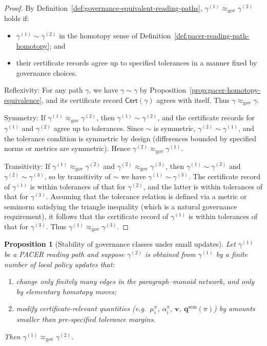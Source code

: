 \documentclass[11pt]{book}
\theoremstyle{plain}
\newtheorem{proposition}[theorem]{Proposition}
\theoremstyle{definition}
\theoremstyle{remark}
\begin{document}
\begin{proof}
By Definition~\ref{def:governance-equivalent-reading-paths},
$\gamma^{(1)}\approx_{\mathrm{gov}}\gamma^{(2)}$ holds if:
\begin{itemize}
  \item $\gamma^{(1)}\sim\gamma^{(2)}$ in the homotopy sense of
        Definition~\ref{def:pacer-reading-path-homotopy}; and
  \item their certificate records agree up to specified tolerances
        in a manner fixed by governance choices.
\end{itemize}

Reflexivity: For any path $\gamma$, we have $\gamma\sim\gamma$ by
Proposition~\ref{prop:pacer-homotopy-equivalence}, and its certificate
record $\mathsf{Cert}(\gamma)$ agrees with itself. Thus
$\gamma\approx_{\mathrm{gov}}\gamma$.

Symmetry: If $\gamma^{(1)}\approx_{\mathrm{gov}}\gamma^{(2)}$, then
$\gamma^{(1)}\sim\gamma^{(2)}$, and the certificate records for
$\gamma^{(1)}$ and $\gamma^{(2)}$ agree up to tolerances. Since
$\sim$ is symmetric, $\gamma^{(2)}\sim\gamma^{(1)}$, and the tolerance
condition is symmetric by design (differences bounded by specified
norms or metrics are symmetric). Hence
$\gamma^{(2)}\approx_{\mathrm{gov}}\gamma^{(1)}$.

Transitivity: If $\gamma^{(1)}\approx_{\mathrm{gov}}\gamma^{(2)}$ and
$\gamma^{(2)}\approx_{\mathrm{gov}}\gamma^{(3)}$, then
$\gamma^{(1)}\sim\gamma^{(2)}$ and $\gamma^{(2)}\sim\gamma^{(3)}$, so
by transitivity of $\sim$ we have $\gamma^{(1)}\sim\gamma^{(3)}$. The
certificate record of $\gamma^{(1)}$ is within tolerances of that for
$\gamma^{(2)}$, and the latter is within tolerances of that for
$\gamma^{(3)}$. Assuming that the tolerance relation is defined via a
metric or seminorm satisfying the triangle inequality (which is a
natural governance requirement), it follows that the certificate
record of $\gamma^{(1)}$ is within tolerances of that for
$\gamma^{(3)}$. Thus
$\gamma^{(1)}\approx_{\mathrm{gov}}\gamma^{(3)}$.
\end{proof}

\begin{proposition}[Stability of governance classes under small updates]
\label{prop:gov-class-stability}
Let $\gamma^{(1)}$ be a PACER reading path and suppose
$\gamma^{(2)}$ is obtained from $\gamma^{(1)}$ by a finite number of
local policy updates that:
\begin{enumerate}
  \item change only finitely many edges in the paragraph–monoid
        network, and only by elementary homotopy moves;
  \item modify certificate-relevant quantities (e.g.\ $\mu_i^\pi$,
        $\alpha_i^\pi$, $\mathbf{v}$, $\mathbf{q}^{\mathrm{sem}}(\pi)$)
        by amounts smaller than pre-specified tolerance margins.
\end{enumerate}
Then $\gamma^{(1)}\approx_{\mathrm{gov}}\gamma^{(2)}$.
\end{proposition}
\end{document}
